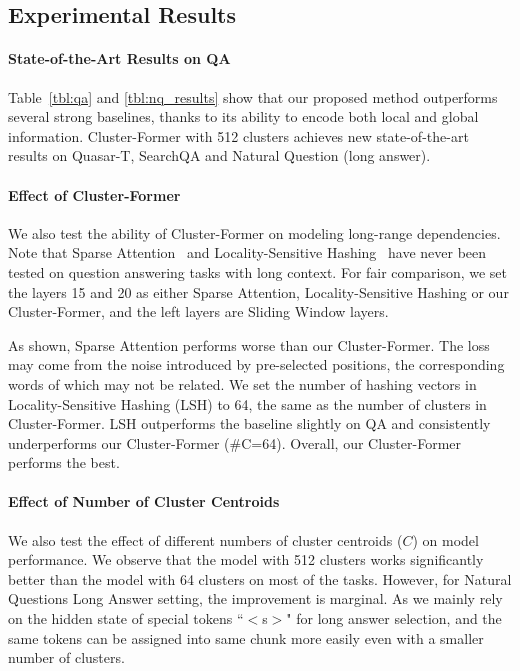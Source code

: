 \subsection{Experimental Results}

\paragraph{State-of-the-Art Results on QA} 
Table~\ref{tbl:qa} and \ref{tbl:nq_results} show that our proposed method outperforms several strong baselines, thanks to its ability to encode both local and global information.
Cluster-Former with 512 clusters achieves new state-of-the-art results on Quasar-T, SearchQA and Natural Question (long answer).

\paragraph{Effect of Cluster-Former}
We also test the ability of Cluster-Former on modeling long-range dependencies.
Note that Sparse Attention~\citep{sparsetransf} and Locality-Sensitive Hashing~\citep{reformer} have never been tested on question answering tasks with long context.
For fair comparison, we set the layers 15 and 20 as either Sparse Attention, Locality-Sensitive Hashing or our Cluster-Former, and the left layers are Sliding Window layers. 


As shown, Sparse Attention performs worse than our Cluster-Former.
The loss may come from the noise introduced by pre-selected positions, the corresponding words of which may not be related.
We set the number of hashing vectors in Locality-Sensitive Hashing (LSH) to 64, the same as the number of clusters in Cluster-Former.
LSH outperforms the baseline slightly on QA and consistently underperforms our Cluster-Former (\#C=64).
Overall, our Cluster-Former performs the best.

\paragraph{Effect of Number of Cluster Centroids} 
We also test the effect of different numbers of cluster centroids ($C$) on model performance. 
We observe that the model with 512 clusters works significantly better than the model with 64 clusters on most of the tasks.
However, for Natural Questions Long Answer setting, the improvement is marginal. As we mainly rely on the hidden state of special tokens ``$<$s$>$" for long answer selection, and the same tokens can be assigned into same chunk more easily even with a smaller number of clusters.


